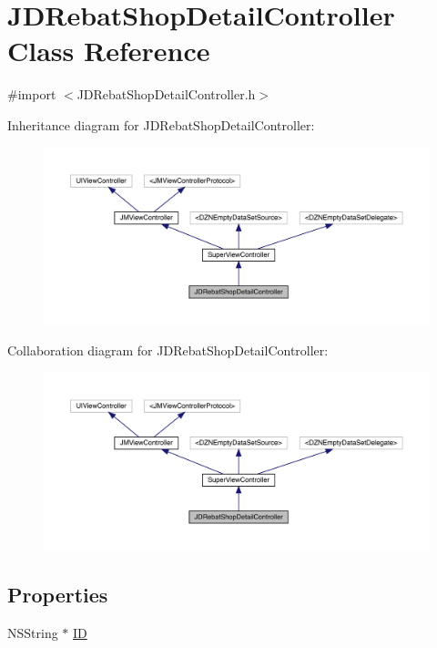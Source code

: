 \hypertarget{interface_j_d_rebat_shop_detail_controller}{}\section{J\+D\+Rebat\+Shop\+Detail\+Controller Class Reference}
\label{interface_j_d_rebat_shop_detail_controller}


{\ttfamily \#import $<$J\+D\+Rebat\+Shop\+Detail\+Controller.\+h$>$}



Inheritance diagram for J\+D\+Rebat\+Shop\+Detail\+Controller\+:\nopagebreak
\begin{figure}[H]
\begin{center}
\leavevmode
\includegraphics[width=350pt]{interface_j_d_rebat_shop_detail_controller__inherit__graph}
\end{center}
\end{figure}


Collaboration diagram for J\+D\+Rebat\+Shop\+Detail\+Controller\+:\nopagebreak
\begin{figure}[H]
\begin{center}
\leavevmode
\includegraphics[width=350pt]{interface_j_d_rebat_shop_detail_controller__coll__graph}
\end{center}
\end{figure}
\subsection*{Properties}
\begin{DoxyCompactItemize}
\item 
N\+S\+String $\ast$ \mbox{\hyperlink{interface_j_d_rebat_shop_detail_controller_aef7a53b442782726e7f876091fa7d06b}{ID}}
\end{DoxyCompactItemize}
